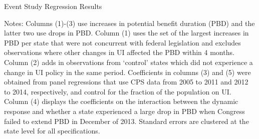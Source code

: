 \documentclass[12pt]{article}
\begin{document}
\begin{spacing}{2}
\begin{sidewaystable}
\caption{Event Study Regression Results \label{tab:eventstudy}}
\centering
\begin{threeparttable}

\begin{tablenotes}
\item Notes: Columns (1)-(3) use increases in potential benefit duration (PBD) and the latter two use drops in PBD. Column (1) uses the set of the largest increases in PBD per state that were not concurrent with federal legislation and excludes observations where other changes in UI affected the PBD within 4 months. Column (2) adds in observations from `control' states which did not experience a change in UI policy in the same period. Coefficients in columns (3) and (5) were obtained from panel regressions that use CPS data from 2005 to 2011 and 2012 to 2014, respectively, and control for the fraction of the population on UI. Column (4) displays the coefficients on the interaction between the dynamic response and whether a state experienced a large drop in PBD when Congress failed to extend PBD in December of 2013. Standard errors are clustered at the state level for all specifications.
\end{tablenotes}
\end{threeparttable}
\end{sidewaystable}


\end{spacing}
\end{document}
